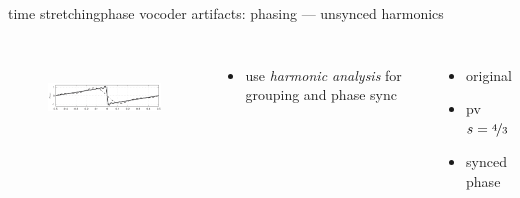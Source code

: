 	\begin{frame}{time stretching}{phase vocoder artifacts: phasing --- unsynced harmonics}
        \vspace{-5mm}
        \begin{columns}
            \begin{figure}
                \centering
                    \includegraphics[width=5.3cm,height=2.4cm]{graph/gibbs}
            \end{figure}
            \begin{itemize}
                \item<2->[$\Rightarrow$] use \textit{harmonic analysis} for grouping and phase sync
            \end{itemize}
                    \begin{itemize}
                        \item   original  
                        \item   pv $s = \nicefrac{4}{3}$ 
                        \item   synced phase 
                    \end{itemize}
        \end{columns}
    \end{frame}
